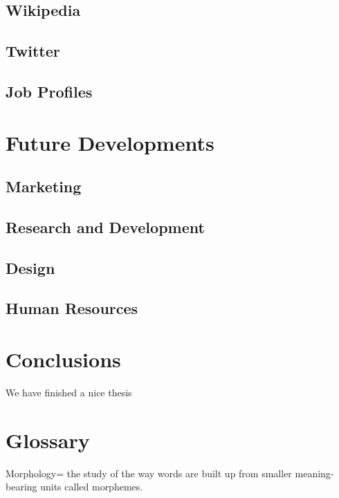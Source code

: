 \documentclass[]{book}
\begin{document}
\section{Wikipedia}\label{wikipedia}

\section{Twitter}\label{twitter}

\section{Job Profiles}\label{job-profiles}

\chapter{Future Developments}\label{future-developments}

\section{Marketing}\label{marketing-1}

\section{Research and Development}\label{research-and-development}

\section{Design}\label{design}

\section{Human Resources}\label{human-resources}

\chapter{Conclusions}\label{conclusions}

We have finished a nice thesis

\chapter{Glossary}\label{glossary}

Morphology= the study of the way words are built up from smaller
meaning-bearing units called morphemes.


\end{document}
